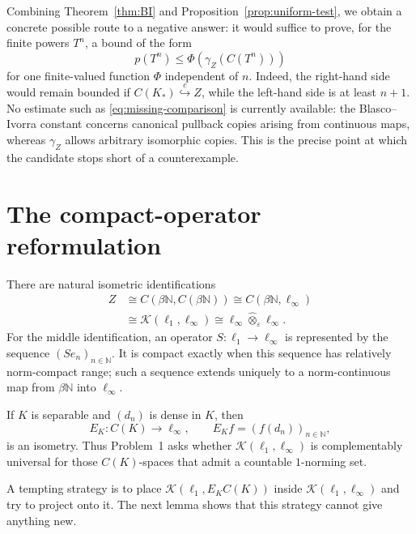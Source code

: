 \documentclass[11pt]{article}
\theoremstyle{definition}
\theoremstyle{remark}
\newcommand{\C}{C}
\newcommand{\bN}{\beta\mathbb N}
\newcommand{\Kop}{\mathcal K}
\newcommand{\hookc}{\stackrel{c}{\hookrightarrow}}
\begin{document}
Combining Theorem~\ref{thm:BI} and
Proposition~\ref{prop:uniform-test}, we obtain a concrete possible route to
a negative answer: it would suffice to prove, for the finite powers $T^n$,
a bound of the form
\begin{equation}\label{eq:missing-comparison}
       p(T^n)\leq \Phi\!\left(\gamma_Z(\C(T^n))\right)
\end{equation}
for one finite-valued function $\Phi$ independent of $n$.  Indeed, the
right-hand side would remain bounded if $\C(K_*)\hookc Z$, while the
left-hand side is at least $n+1$.  No estimate such as
\eqref{eq:missing-comparison} is currently available: the Blasco--Ivorra
constant concerns canonical pullback copies arising from continuous maps,
whereas $\gamma_Z$ allows arbitrary isomorphic copies.  This is the precise
point at which the candidate stops short of a counterexample.

\section{The compact-operator reformulation}

There are natural isometric identifications
\begin{equation}\label{eq:operator-identification}
 \begin{split}
 Z
 &\cong \C(\bN,\C(\bN))
  \cong \C(\bN,\ell_\infty)\\
 &\cong \Kop(\ell_1,\ell_\infty)
  \cong \ell_\infty\widehat\otimes_\varepsilon\ell_\infty.
 \end{split}
\end{equation}
For the middle identification, an operator
$S:\ell_1\to\ell_\infty$ is represented by the sequence
$(Se_n)_{n\in\mathbb N}$.  It is compact exactly when this sequence has
relatively norm-compact range; such a sequence extends uniquely to a
norm-continuous map from $\bN$ into $\ell_\infty$.

If $K$ is separable and $(d_n)$ is dense in $K$, then
\begin{equation}\label{eq:dense-evaluation}
       E_K:\C(K)\longrightarrow\ell_\infty,
       \qquad E_Kf=(f(d_n))_{n\in\mathbb N},
\end{equation}
is an isometry.  Thus Problem~1 asks whether
$\Kop(\ell_1,\ell_\infty)$ is complementably universal for those
$\C(K)$-spaces that admit a countable $1$-norming set.

A tempting strategy is to place $\Kop(\ell_1,E_K\C(K))$ inside
$\Kop(\ell_1,\ell_\infty)$ and try to project onto it.  The next lemma shows
that this strategy cannot give anything new.
\end{document}
